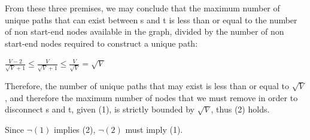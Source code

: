 \documentclass[]{report}
\begin{document}
	From these three premises, we may conclude that the maximum number of unique paths that can exist between s and t is less than or equal to the number of non start-end nodes available in the graph, divided by the number of non start-end nodes required to construct a unique path:  
	\bigskip
	
	$\frac{V -2}{\sqrt{V} + 1} \leq \frac{V}{\sqrt{V} + 1} \leq \frac{V}{\sqrt{V}} = \sqrt{V}$
	\bigskip

	Therefore, the number of unique paths that may exist is less than or equal to $\sqrt{V}$, and therefore the maximum number of nodes that we must remove in order to disconnect s and t, given (1), is strictly bounded by $\sqrt{V}$, thus (2) holds.
	\bigskip
	
	Since $\neg(1)$ implies (2), $\neg(2)$ must imply (1).
\end{document}
